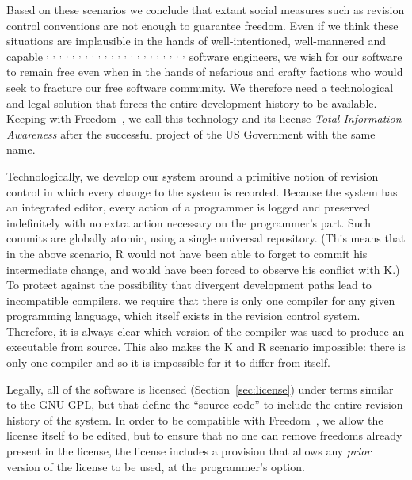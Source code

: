 \documentclass[twocolumn]{article}
\begin{document}
Based on these scenarios we conclude that extant social measures such
as revision control conventions are not enough to guarantee freedom.
Even if we think these situations are implausible in the hands of
well-intentioned, well-mannered and capable%
%
$^,$%
$^,$%
$^,$%
$^,$%
$^,$%
$^,$%
$^,$%
$^,$%
$^,$%
$^,$%
$^,$%
$^,$%
$^,$%
$^,$%
$^,$%
$^,$%
$^,$%
$^,$%
$^,$%
$^,$%
$^,$%
$^,$%
%
software engineers, we wish for our software to remain free even when
in the hands of nefarious and crafty factions who would seek to
fracture our free software
community. We therefore need a technological and legal solution that
forces the entire development history to be available. Keeping with
Freedom~\fusa, we call this technology and its license {\em Total
Information Awareness} after the successful project of the US
Government with the same name.\z{}

Technologically, we develop our system around a primitive notion of
revision control in which every change to the system is recorded.
Because the system has an integrated editor, every action of a
programmer is logged and preserved indefinitely with no extra action
necessary on the programmer's part. Such commits are globally atomic,
using a single universal repository. (This means that in the above
scenario, R would not have been able to forget to commit his
intermediate change, and would have been forced to observe his
conflict with K.) To protect against the possibility that divergent
development paths lead to incompatible compilers, we require that
there is only one compiler for any given programming language, which
itself exists in the revision control system. Therefore, it is always
clear which version of the compiler was used to produce an executable
from source. This also makes the K and R scenario impossible: there is
only one compiler and so it is impossible for it to differ from
itself.

Legally, all of the software is licensed (Section~\ref{sec:license})
under terms similar to the GNU GPL, but that define the ``source
code'' to include the entire revision history of the system. In order
to be compatible with Freedom~\ffree, we allow the license itself to be
edited, but to ensure that no one can remove freedoms already present
in the license, the license includes a provision that allows any {\em
prior} version of the license to be used, at the programmer's option.
\end{document}

